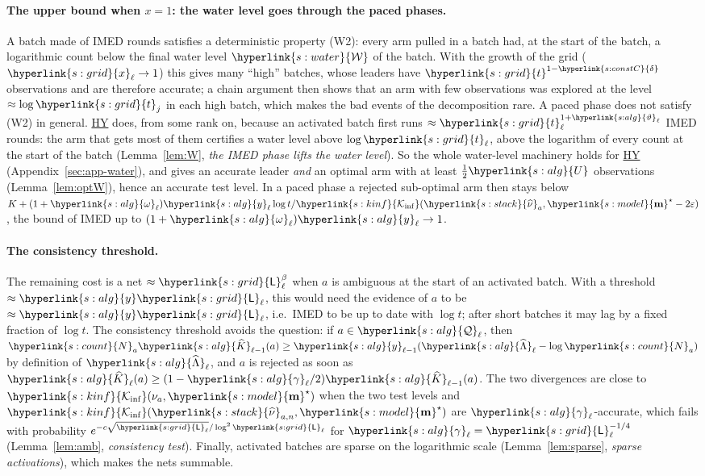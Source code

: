 \documentclass[10pt]{article}
\newcommand{\sy}[2]{{\hyperlink{#1}{#2}}}
\newcommand{\1}{\mathbf{1}}
\newcommand{\m}{\sy{s:model}{\mathbf{m}}}
\newcommand{\Ki}{\sy{s:kinf}{\mathcal K_{\inf}}}
\newcommand{\Ng}{\sy{s:count}{N}}
\newcommand{\hnu}{\sy{s:stack}{\widehat\nu}}
\newcommand{\tl}{\sy{s:grid}{t}}
\newcommand{\Lg}{\sy{s:grid}{\mathsf L}}
\newcommand{\xg}{\sy{s:grid}{x}}
\newcommand{\HY}{\hyperref[def:hy]{\textup{HY}}}
\newcommand{\yg}{\sy{s:alg}{y}}
\newcommand{\Ug}{\sy{s:alg}{U}}
\newcommand{\Kh}{\sy{s:alg}{\widehat K}}
\newcommand{\Qp}{\sy{s:alg}{\mathcal Q}}
\newcommand{\Lh}{\sy{s:alg}{\widehat\Lambda}}
\newcommand{\om}{\sy{s:alg}{\omega}}
\newcommand{\thv}{\sy{s:alg}{\vartheta}}
\newcommand{\gam}{\sy{s:alg}{\gamma}}
\newcommand{\dl}{\sy{s:constC}{\delta}}
\newcommand{\Lam}{\sy{s:water}{\mathcal W}}
\begin{document}
\paragraph{The upper bound when $x=1$: the water level goes through the paced phases.} A batch made of IMED rounds satisfies a deterministic property (W2): every arm
pulled in a batch had, at the start of the batch, a logarithmic count below the final water level $\Lam$ of the batch. With the growth of the grid ($\xg_\ell\to1$) this
gives many ``high'' batches, whose leaders have $\tl^{1-\dl}$ observations and are therefore accurate; a chain argument then shows that an arm with few observations
was explored at the level $\approx\log\tl_j$ in each high batch, which makes the bad events of the decomposition rare. A paced phase does not satisfy (W2) in general.
\HY{} does, from some rank on, because an activated batch first runs $\approx\tl_\ell^{1+\thv_\ell}$ IMED rounds: the arm that gets most of them certifies a water level above
$\log\tl_\ell$, above the logarithm of every count at the start of the batch (Lemma~\ref{lem:W}, \emph{the IMED phase lifts the water level}). So the whole water-level machinery holds for \HY{}
(Appendix~\ref{sec:app-water}), and gives an accurate leader \emph{and} an optimal arm with at least $\frac12\Ug$ observations (Lemma~\ref{lem:optW}), hence an accurate test
level. In a paced phase a rejected sub-optimal arm then stays below $K+(1+\om_\ell)\yg_\ell\log t/\Ki(\hnu_a,\m^\star-2\varepsilon)$, the bound of IMED up to $(1+\om_\ell)\yg_\ell\to1$.

\paragraph{The consistency threshold.} The remaining cost is a net $\approx\Lg_\ell^\beta$ when $a$ is ambiguous at the start of an activated batch. With a threshold
$\approx\yg\Lg_\ell$, this would need the evidence of $a$ to be $\approx\yg\Lg_\ell$, i.e.\ IMED to be up to date with $\log t$; after short batches it may lag by a fixed
fraction of $\log t$. The consistency threshold avoids the question: if $a\in\Qp_\ell$, then $\Ng_a\Kh_{\ell-1}(a)\ge\yg_{\ell-1}(\Lh_\ell-\log\Ng_a)$ by definition of $\Lh_\ell$, and
$a$ is rejected as soon as $\Kh_\ell(a)\ge(1-\gam_\ell/2)\Kh_{\ell-1}(a)$. The two divergences are close to $\Ki(\nu_a,\m^\star)$ when the two test levels and $\Ki(\hnu_{a,n},\m^\star)$
are $\gam_\ell$-accurate, which fails with probability $e^{-c\sqrt{\Lg_\ell}/\log^2\Lg_\ell}$ for $\gam_\ell=\Lg_\ell^{-1/4}$ (Lemma~\ref{lem:amb}, \emph{consistency test}). Finally, activated batches are
sparse on the logarithmic scale (Lemma~\ref{lem:sparse}, \emph{sparse activations}), which makes the nets summable.
\end{document}
